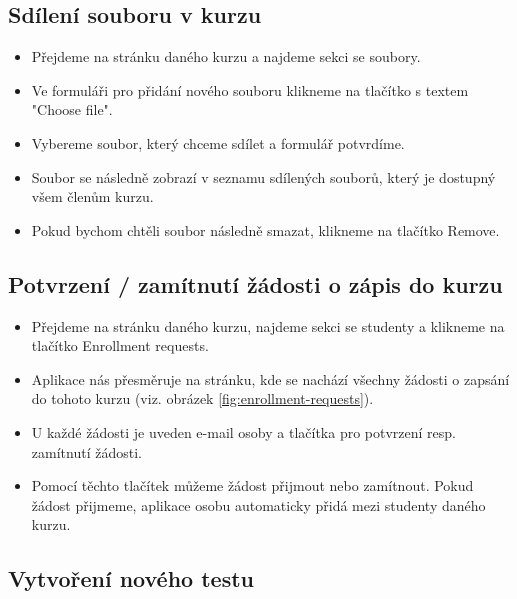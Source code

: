 \subsection{Sdílení souboru v kurzu}
\begin{itemize}
	\item Přejdeme na stránku daného kurzu a najdeme sekci se soubory.
	\item Ve formuláři pro přidání nového souboru klikneme na tlačítko s textem "Choose file".
	\item Vybereme soubor, který chceme sdílet a formulář potvrdíme.
	\item Soubor se následně zobrazí v seznamu sdílených souborů, který je dostupný všem členům kurzu.
	\item Pokud bychom chtěli soubor následně smazat, klikneme na tlačítko Remove.
\end{itemize}

\subsection{Potvrzení / zamítnutí žádosti o zápis do kurzu}
\begin{itemize}
	\item Přejdeme na stránku daného kurzu, najdeme sekci se studenty a klikneme na tlačítko Enrollment requests.
	\item Aplikace nás přesměruje na stránku, kde se nachází všechny žádosti o zapsání do tohoto kurzu (viz. obrázek \ref{fig:enrollment-requests}).
	\item U každé žádosti je uveden e-mail osoby a tlačítka pro potvrzení resp. zamítnutí žádosti.
	\item Pomocí těchto tlačítek můžeme žádost přijmout nebo zamítnout. Pokud žádost přijmeme, aplikace osobu automaticky přidá mezi studenty daného kurzu.
\end{itemize}

\subsection{Vytvoření nového testu}

